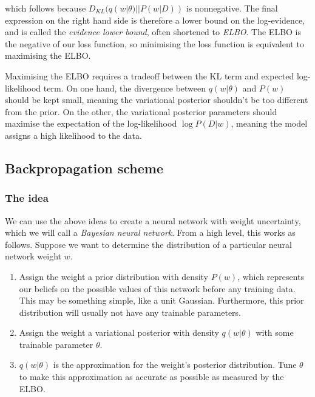\documentclass[11pt]{article}
\providecommand{\tightlist}{%
      \setlength{\itemsep}{0pt}\setlength{\parskip}{0pt}}
\begin{document}
which follows because \(D_{KL} (q(w | \theta) || P(w | D))\) is
nonnegative. The final expression on the right hand side is therefore a
lower bound on the log-evidence, and is called the \emph{evidence lower
bound}, often shortened to \emph{ELBO}. The ELBO is the negative of our
loss function, so minimising the loss function is equivalent to
maximising the ELBO.

Maximising the ELBO requires a tradeoff between the KL term and expected
log-likelihood term. On one hand, the divergence between
\(q(w | \theta)\) and \(P(w)\) should be kept small, meaning the
variational posterior shouldn't be too different from the prior. On the
other, the variational posterior parameters should maximise the
expectation of the log-likelihood \(\log P(D | w)\), meaning the model
assigns a high likelihood to the data.

    \hypertarget{backpropagation-scheme}{%
\subsection{Backpropagation scheme}\label{backpropagation-scheme}}

\hypertarget{the-idea}{%
\subsubsection{The idea}\label{the-idea}}

We can use the above ideas to create a neural network with weight
uncertainty, which we will call a \emph{Bayesian neural network}. From a
high level, this works as follows. Suppose we want to determine the
distribution of a particular neural network weight \(w\).

\begin{enumerate}
\def\labelenumi{\arabic{enumi}.}
\tightlist
\item
  Assign the weight a prior distribution with density \(P(w)\), which
  represents our beliefs on the possible values of this network before
  any training data. This may be something simple, like a unit Gaussian.
  Furthermore, this prior distribution will usually not have any
  trainable parameters.
\item
  Assign the weight a variational posterior with density
  \(q(w | \theta)\) with some trainable parameter \(\theta\).
\item
  \(q(w | \theta)\) is the approximation for the weight's posterior
  distribution. Tune \(\theta\) to make this approximation as accurate
  as possible as measured by the ELBO.
\end{enumerate}
\end{document}
